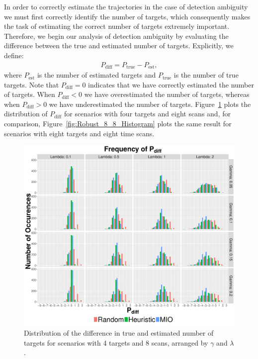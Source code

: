 In order to correctly estimate the trajectories in the case of detection ambiguity we must first correctly identify the number of targets, which consequently makes the task of estimating the correct number of targets extremely important. Therefore, we begin our analysis of detection ambiguity by evaluating the difference between the true and estimated number of targets. Explicitly, we define:
\begin{align}
	P_{\text{diff}} = P_{\text{true}} - P_{\text{est}},
\end{align}
where $P_{\text{est}}$ is the number of estimated targets and $ P_{\text{true}}$ is the number of true targets. Note that $P_{\text{diff}} = 0$ indicates that we have correctly estimated the number of targets. When $P_{\text{diff}} < 0$ we have overestimated the number of targets, whereas when $P_{\text{diff}} > 0$ we have underestimated the number of targets. Figure~\ref{fig:Robust_4_8_Histogram} plots the distribution of $P_{\text{diff}}$ for scenarios with four targets and eight scans and, for comparison, Figure~\ref{fig:Robust_8_8_Histogram} plots the same result for scenarios with eight targets and eight time scans. 
\begin{figure}[ht]
  \centering
  \includegraphics[width=\columnwidth]{../Figures/4_8_Histogram}
  \caption{Distribution of the difference in true and estimated number of targets for scenarios with 4 targets and 8 scans, arranged by $\gamma$ and $\lambda$.}
  \label{fig:Robust_4_8_Histogram}
\end{figure}
